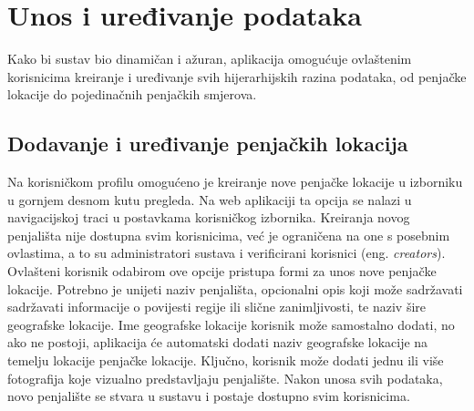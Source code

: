\section{Unos i uređivanje podataka}

Kako bi sustav bio dinamičan i ažuran, aplikacija omogućuje ovlaštenim korisnicima kreiranje i uređivanje svih hijerarhijskih razina podataka, od penjačke lokacije do pojedinačnih penjačkih smjerova.

\subsection{Dodavanje i uređivanje penjačkih lokacija}

Na korisničkom profilu omogućeno je kreiranje nove penjačke lokacije u izborniku u gornjem desnom kutu pregleda. Na web aplikaciji ta opcija se nalazi u navigacijskoj traci u postavkama korisničkog izbornika. Kreiranja novog penjališta nije dostupna svim korisnicima, već je ograničena na one s posebnim ovlastima, a to su administratori sustava i verificirani korisnici (eng. \textit{creators}). 
Ovlašteni korisnik odabirom ove opcije pristupa formi za unos nove penjačke lokacije. Potrebno je unijeti naziv penjališta, opcionalni opis koji može sadržavati sadržavati informacije o povijesti regije ili slične zanimljivosti, te naziv šire geografske lokacije. Ime geografske lokacije korisnik može samostalno dodati, no ako ne postoji, aplikacija će automatski dodati naziv geografske lokacije na temelju lokacije penjačke lokacije. Ključno, korisnik može dodati jednu ili više fotografija koje vizualno predstavljaju penjalište. Nakon unosa svih podataka, novo penjalište se stvara u sustavu i postaje dostupno svim korisnicima.

